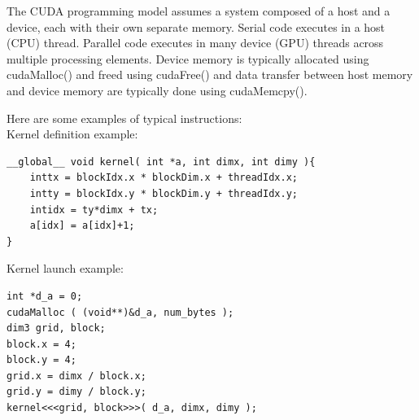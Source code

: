 The CUDA programming model assumes a system composed of a host and a device, each with their own separate memory. Serial code executes in a host (CPU) thread. Parallel code executes in many device (GPU) threads across multiple processing elements. Device memory is typically allocated using cudaMalloc() and freed using cudaFree() and data transfer between host memory and device memory are typically done using cudaMemcpy(). 

Here are some examples of typical instructions:\\
Kernel definition example:
\begin{lstlisting}[frame=single]
__global__ void kernel( int *a, int dimx, int dimy ){
	inttx = blockIdx.x * blockDim.x + threadIdx.x;
	intty = blockIdx.y * blockDim.y + threadIdx.y;
	intidx = ty*dimx + tx;
	a[idx] = a[idx]+1;
}
\end{lstlisting}
Kernel launch example:
\begin{lstlisting}[frame=single]
int *d_a = 0;
cudaMalloc ( (void**)&d_a, num_bytes );
dim3 grid, block;
block.x = 4;
block.y = 4;
grid.x = dimx / block.x;
grid.y = dimy / block.y;
kernel<<<grid, block>>>( d_a, dimx, dimy );
\end{lstlisting}